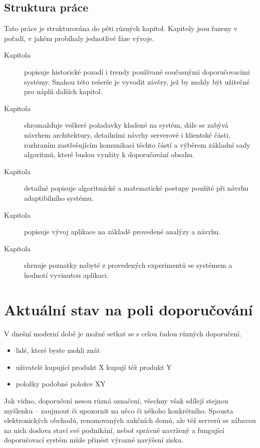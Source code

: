 \documentclass[thesis=M,czech]{FITthesis}[2014/05/07]
\begin{document}
\begin{introduction}
\section{Struktura práce}
\label{sec:structure}
	Tato práce je strukturována do pěti různých kapitol. Kapitoly jsou řazeny v pořadí, v jakém probíhaly jednotlivé fáze vývoje.	

\begin{description}
  \item[Kapitola ] popisuje historické pozadí i trendy používané současnými doporučovacími systémy. Snahou této rešerše je vyvodit závěry, jež by mohly být užitečné pro náplň dalších kapitol.
  \item[Kapitola ] shromažďuje veškeré požadavky kladené na systém, dále se zabývá návrhem architektury, detailními návrhy serverové i klientské části, rozhraním zastřešujícím komunikaci těchto částí a výběrem základní sady algoritmů, které budou využity k doporučování obsahu. 
  \item[Kapitola ] detailně popisuje algoritmické a matematické postupy použité při návrhu adaptibilního systému. 
  \item[Kapitola ] popisuje vývoj aplikace na základě provedené analýzy a návrhu.
  \item[Kapitola ] shrnuje poznatky nabyté z provedených experimentů se systémem a hodnotí vyvinutou aplikaci. 
\end{description}
	
\end{introduction}
	
\chapter{Aktuální stav na poli doporučování}	
\label{chap:current}

V dnešní moderní době je možné setkat se s celou řadou různých doporučení.

\begin{itemize}
	\item lidé, které byste mohli znát
	\item uživatelé kupující produkt X kupují též produkt Y
	\item položky podobné položce XY	
\end{itemize}

Jak vidno, doporučení nesou různá označení, všechny však sdílejí stejnou myšlenku – zaujmout či upozornit na něco či někoho konkrétního. Spousta elektronických obchodů, renomovaných aukčních domů, ale též serverů se zábavou na nich doslova staví své podnikání, neboť správně navržený a fungující doporučovací systém může přinést výrazné navýšení zisku. 
\end{document}
